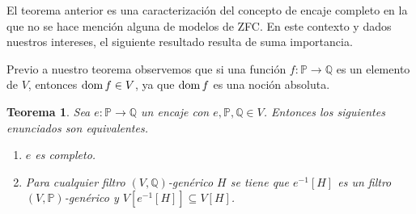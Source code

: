 \documentclass[11pt]{unam_tesis1}
\theoremstyle{MyThmStyle}
\theoremstyle{definition}
\theoremstyle{plain}
\newtheorem{theorem}[definition]{Teorema}
\theoremstyle{remark}
\def\dom{\mathop{\rm dom}\nolimits}
\begin{document}
El teorema anterior es una caracterizaci\'on del concepto de encaje completo en la que no se hace menci\'on alguna de modelos de ZFC. En este contexto y dados nuestros intereses, el siguiente resultado resulta de suma importancia.

Previo a nuestro teorema observemos que si una funci\'on $f:\mathbb P\to \mathbb Q$ es un elemento de $V$, entonces $\dom f \in V$, ya que $\dom f$ es una noci\'on absoluta.

\begin{theorem}\label{encajeuno}
Sea $e:\mathbb P\to \mathbb Q$ un encaje con $e,\mathbb P,\mathbb Q\in V$. Entonces los siguientes enunciados son equivalentes.
\begin{enumerate}
\item $e$ es completo.
\item Para cualquier filtro $(V,\mathbb Q)$-gen\'erico $H$ se tiene que $e^{-1}[H]$ es un filtro $(V,\mathbb P)$-gen\'erico y $V[e^{-1}[H]] \subseteq V[H]$.
\end{enumerate}
\end{theorem}
\end{document}
